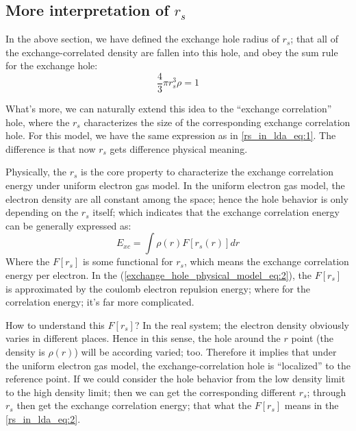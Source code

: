 \subsection{More interpretation of $r_{s}$}
\label{sec:rs_in_LDA}

In the above section, we have defined the exchange hole radius of
$r_{s}$; that all of the exchange-correlated density are fallen into
this hole, and obey the sum rule for the exchange hole:
\begin{equation}
  \label{rs_in_lda_eq:1}
  \frac{4}{3}\pi r_{s}^{3}\rho = 1
\end{equation}

What's more, we can naturally extend this idea to the
``exchange correlation'' hole, where the $r_{s}$ characterizes the
size of the corresponding exchange correlation hole. For this model,
we have the same expression as in \ref{rs_in_lda_eq:1}. The difference
is that now $r_{s}$ gets difference physical meaning.

Physically, the $r_{s}$ is the core property to characterize the
exchange correlation energy under uniform electron gas model. In the
uniform electron gas model, the electron density are all constant
among the space; hence the hole behavior is only depending on the
$r_{s}$ itself; which indicates that the exchange correlation energy
can be generally expressed as:
\begin{equation}
  \label{rs_in_lda_eq:2}
  E_{xc} = \int \rho(r)F[r_{s}(r)]dr
\end{equation}
Where the $F[r_{s}]$ is some functional for $r_{s}$, which means the
exchange correlation energy per electron. In the
(\ref{exchange_hole_physical_model_eq:2}), the $F[r_{s}]$ is
approximated by the coulomb electron repulsion energy; where for the
correlation energy; it's far more complicated.

How to understand this $F[r_{s}]$? In the real system; the electron
density obviously varies in different places. Hence in this sense, the
hole around the $r$ point (the density is $\rho(r)$) will be according
varied; too. Therefore it implies that under the uniform electron gas
model, the exchange-correlation hole is ``localized'' to the reference
point. If we could consider the hole behavior from the low density
limit to the high density limit; then we can get the corresponding
different $r_{s}$; through $r_{s}$ then get the exchange correlation
energy; that what the $F[r_{s}]$ means in the \ref{rs_in_lda_eq:2}.






